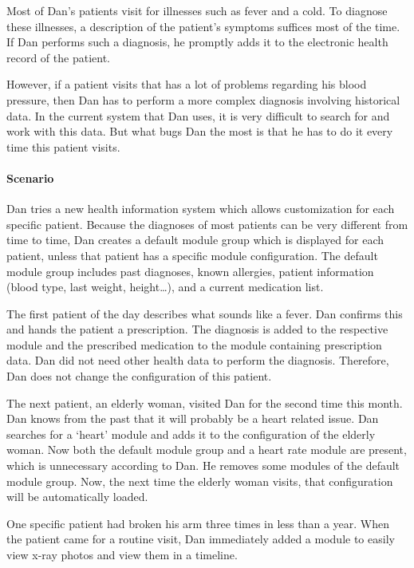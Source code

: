         Most of Dan's patients visit for illnesses such as fever and a cold. To diagnose these illnesses, a description of the patient's symptoms suffices most of the time. If Dan performs such a diagnosis, he promptly adds it to the electronic health record of the patient.

        However, if a patient visits that has a lot of problems regarding his blood pressure, then Dan has to perform a more complex diagnosis involving historical data. In the current system that Dan uses, it is very difficult to search for and work with this data. But what bugs Dan the most is that he has to do it every time this patient visits.

        \paragraph{Scenario} Dan tries a new health information system which allows customization for each specific patient. Because the diagnoses of most patients can be very different from time to time, Dan creates a default module group which is displayed for each patient, unless that patient has a specific module configuration. The default module group includes past diagnoses, known allergies, patient information (blood type, last weight, height\ldots), and a current medication list.

        The first patient of the day describes what sounds like a fever. Dan confirms this and hands the patient a prescription. The diagnosis is added to the respective module and the prescribed medication to the module containing prescription data. Dan did not need other health data to perform the diagnosis. Therefore, Dan does not change the configuration of this patient.

        The next patient, an elderly woman, visited Dan for the second time this month. Dan knows from the past that it will probably be a heart related issue. Dan searches for a `heart' module and adds it to the configuration of the elderly woman. Now both the default module group and a heart rate module are present, which is unnecessary according to Dan. He removes some modules of the default module group. Now, the next time the elderly woman visits, that configuration will be automatically loaded.

        One specific patient had broken his arm three times in less than a year. When the patient came for a routine visit, Dan immediately added a module to easily view x-ray photos and view them in a timeline.\bigskip

